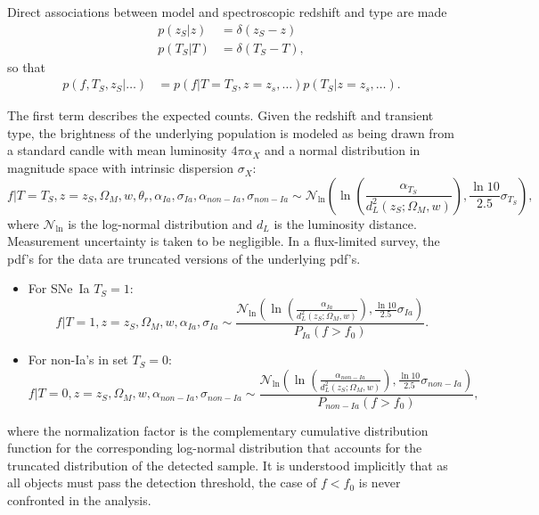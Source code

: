\documentclass[preprint,3p]{elsarticle}
\begin{document}
Direct associations between model and spectroscopic redshift and type are made
\begin{align}
p(z_S|z) &= \delta(z_S-z)\\
p(T_S|T) &= \delta(T_S-T),
\label{specz:eqn}
\end{align}
so that
\begin{align}
p(f, {{T}}_S,{{z}}_S|  \ldots) &= 
p(f| T=T_S, z=z_s,\dots) p(T_S|z=z_s, \ldots).
\label{obs:eqn}
\end{align}


The first term describes the expected counts. Given the redshift
and transient type, the brightness of the underlying population
is modeled as being drawn from a standard candle
with mean luminosity $4\pi\alpha_X$ and a normal distribution in magnitude
space with intrinsic dispersion  $\sigma_X$:
\begin{equation}
f| T=T_S, z=z_S, \Omega_M, w, \theta_r, \alpha_{Ia},\sigma_{Ia}, \alpha_{\mathit{non-Ia}},\sigma_{\mathit{non-Ia}} \sim \mathcal{N}_{\ln}\left(\ln{\left(\frac{\alpha_{T_S}}{d_L^2(z_S;\Omega_M, w)}\right)}, \frac{\ln{10}}{2.5}\sigma_{T_S}\right),
\label{flux:eqn}
\end{equation}
where $\mathcal{N}_{\ln}$ is the log-normal distribution and $d_L$ is the luminosity distance.
Measurement uncertainty is taken to be negligible.
In a flux-limited survey, the pdf's for the data are truncated versions of the underlying
pdf's.
\begin{itemize}
\item For SNe~Ia  $T_S=1$:
\begin{equation}
f | T=1, z=z_S, \Omega_M, w, \alpha_{Ia},\sigma_{Ia} \sim
\frac{\mathcal{N}_{\ln}\left(\ln{\left(\frac{\alpha_{Ia}}{d_L^2(z_S;\Omega_M, w)}\right)}, \frac{\ln{10}}{2.5}\sigma_{Ia}\right)}{P_{Ia}(f > f_0)}.
\label{adusnIa:eqn}
\end{equation}
\item For non-Ia's in set $T_S=0$:
\begin{equation}
f | T=0, z=z_S, \Omega_M, w, \alpha_{\mathit{non-Ia}},\sigma_{\mathit{non-Ia}}\sim 
\frac{\mathcal{N}_{\ln}\left(\ln{\left(\frac{\alpha_{\mathit{non-Ia}}}{d_L^2(z_S;\Omega_M, w)}\right)}, \frac{\ln{10}}{2.5}\sigma_{\mathit{non-Ia}}\right)}{P_{non-Ia}(f > f_0)},
\label{adunonIa:eqn}
\end{equation}
\end{itemize}
where the normalization factor is the complementary cumulative distribution function
for the corresponding log-normal distribution that accounts for the truncated
distribution of the detected sample.
It is understood implicitly that as all objects must pass the detection threshold,
the case of $f<f_0$ is never confronted in the analysis.
\end{document}
